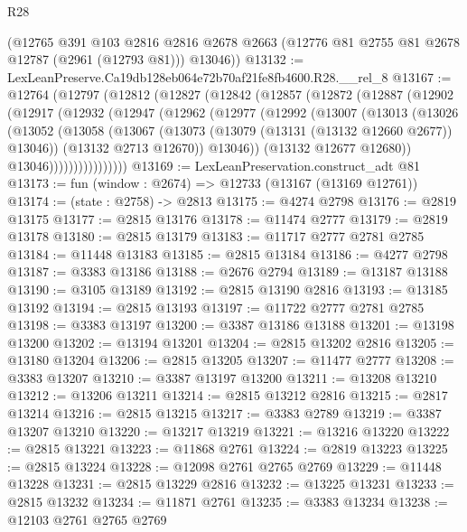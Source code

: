 \begin{lexlean}{R28}
\begin{coremodule}
      (@12765
        @391
        @103
        @2816
        @2816
        @2678
        @2663
        (@12776 @81 @2755 @81 @2678 @12787 (@2961 (@12793 @81)))
        @13046))
@13132 := LexLeanPreserve.Ca19db128eb064e72b70af21fe8fb4600.R28.__rel_8
@13167 := @12764
    (@12797
      (@12812
        (@12827
          (@12842
            (@12857
              (@12872
                (@12887
                  (@12902
                    (@12917
                      (@12932
                        (@12947
                          (@12962
                            (@12977
                              (@12992
                                (@13007
                                  (@13013
                                    (@13026
                                      (@13052
                                        (@13058
                                          (@13067
                                            (@13073 (@13079 (@13131 (@13132 @12660 @2677)) @13046))
                                            (@13132 @2713 @12670))
                                          @13046))
                                      (@13132 @12677 @12680))
                                    @13046))))))))))))))))
@13169 := LexLeanPreservation.construct_adt @81
@13173 := fun (window : @2674) => @12733 (@13167 (@13169 @12761))
@13174 := (state : @2758) -> @2813
@13175 := @4274 @2798
@13176 := @2819 @13175
@13177 := @2815 @13176
@13178 := @11474 @2777
@13179 := @2819 @13178
@13180 := @2815 @13179
@13183 := @11717 @2777 @2781 @2785
@13184 := @11448 @13183
@13185 := @2815 @13184
@13186 := @4277 @2798
@13187 := @3383 @13186
@13188 := @2676 @2794
@13189 := @13187 @13188
@13190 := @3105 @13189
@13192 := @2815 @13190 @2816
@13193 := @13185 @13192
@13194 := @2815 @13193
@13197 := @11722 @2777 @2781 @2785
@13198 := @3383 @13197
@13200 := @3387 @13186 @13188
@13201 := @13198 @13200
@13202 := @13194 @13201
@13204 := @2815 @13202 @2816
@13205 := @13180 @13204
@13206 := @2815 @13205
@13207 := @11477 @2777
@13208 := @3383 @13207
@13210 := @3387 @13197 @13200
@13211 := @13208 @13210
@13212 := @13206 @13211
@13214 := @2815 @13212 @2816
@13215 := @2817 @13214
@13216 := @2815 @13215
@13217 := @3383 @2789
@13219 := @3387 @13207 @13210
@13220 := @13217 @13219
@13221 := @13216 @13220
@13222 := @2815 @13221
@13223 := @11868 @2761
@13224 := @2819 @13223
@13225 := @2815 @13224
@13228 := @12098 @2761 @2765 @2769
@13229 := @11448 @13228
@13231 := @2815 @13229 @2816
@13232 := @13225 @13231
@13233 := @2815 @13232
@13234 := @11871 @2761
@13235 := @3383 @13234
@13238 := @12103 @2761 @2765 @2769

\end{coremodule}
\end{lexlean}
